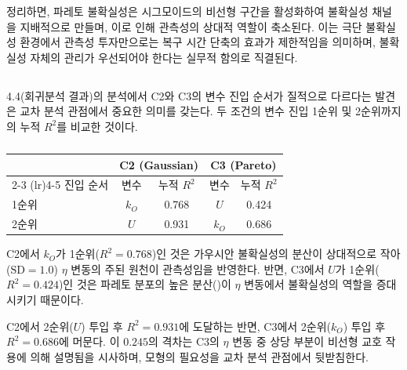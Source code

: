 정리하면, 파레토 불확실성은 시그모이드의 비선형 구간을 활성화하여
불확실성 채널을 지배적으로 만들며, 이로 인해 관측성의 상대적 역할이 축소된다.
이는 극단 불확실성 환경에서 관측성 투자만으로는 복구 시간 단축의
효과가 제한적임을 의미하며, 불확실성 자체의 관리가 우선되어야 한다는
실무적 함의로 직결된다.


\subsection{}
\label{subsec:ch5_dominant_variable}

4.4(회귀분석 결과)의 분석에서 C2와 C3의 변수 진입 순서가 질적으로
다르다는 발견은 교차 분석 관점에서 중요한 의미를 갖는다.
 두 조건의 변수 진입 1순위 및
2순위까지의 누적 $R^2$를 비교한 것이다.

\begin{table}[htbp]
  \centering
  \caption{}
  \label{tab:ch5_dominant_var}
  \begin{tabular}{l cc cc}
    \toprule
    & \multicolumn{2}{c}{\textbf{C2 (Gaussian)}} & \multicolumn{2}{c}{\textbf{C3 (Pareto)}} \\
    \cmidrule(lr){2-3} \cmidrule(lr){4-5}
    진입 순서 & 변수 & 누적 $R^2$ & 변수 & 누적 $R^2$ \\
    \midrule
    1순위 & $k_O$ & 0.768 & $U$ & 0.424 \\
    2순위 & $U$ & 0.931 & $k_O$ & 0.686 \\
    \bottomrule
  \end{tabular}
\end{table}

C2에서 $k_O$가 1순위($R^2 = 0.768$)인 것은 가우시안 불확실성의
분산이 상대적으로 작아($\mathrm{SD} = 1.0$) $\eta$ 변동의 주된 원천이
관측성임을 반영한다. 반면, C3에서 $U$가 1순위($R^2 = 0.424$)인 것은
파레토 분포의 높은 분산()이
$\eta$ 변동에서 불확실성의 역할을 증대시키기 때문이다.

C2에서 2순위($U$) 투입 후 $R^2 = 0.931$에 도달하는 반면,
C3에서 2순위($k_O$) 투입 후 $R^2 = 0.686$에 머문다.
이 $0.245$의 격차는 C3의 $\eta$ 변동 중 상당 부분이
비선형 교호 작용에 의해 설명됨을 시사하며,
 모형의 필요성을 교차 분석 관점에서 뒷받침한다.

